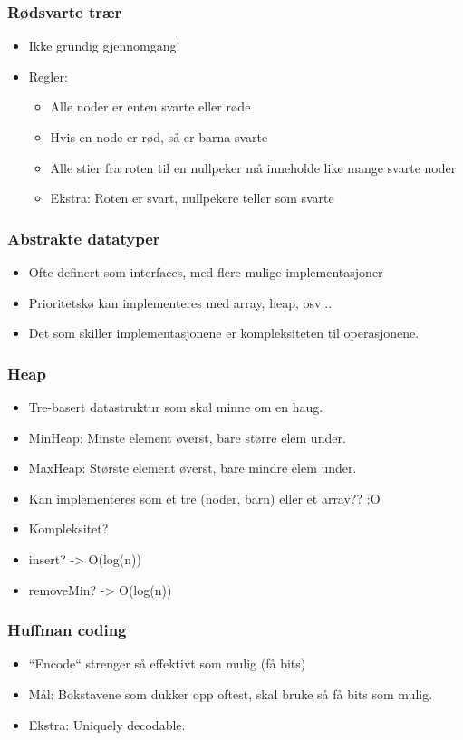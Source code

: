 \documentclass[norsk, handout]{beamer}
\begin{document}
    \begin{frame}
        \frametitle{Rødsvarte trær}
        \begin{itemize}
            \item Ikke grundig gjennomgang!
            \item Regler:
                \begin{itemize}
                    \item Alle noder er enten svarte eller røde
                    \item Hvis en node er rød, så er barna svarte
                    \item Alle stier fra roten til en nullpeker må inneholde like mange
                        svarte noder
                    \item Ekstra: Roten er svart, nullpekere teller som svarte
                \end{itemize}
        \end{itemize}
    \end{frame}

	\begin{frame}
		\frametitle{Abstrakte datatyper}
		\begin{itemize}
			\item Ofte definert som interfaces, med flere mulige implementasjoner
			\item Prioritetskø kan implementeres med array, heap, osv...
			\item Det som skiller implementasjonene er kompleksiteten til operasjonene.
		\end{itemize}
	\end{frame}

	\begin{frame}
		\frametitle{Heap}
		\begin{itemize}
			\item Tre-basert datastruktur som skal minne om en haug.
			\item MinHeap: Minste element øverst, bare større elem under.
			\item MaxHeap: Største element øverst, bare mindre elem under.
			\item Kan implementeres som et tre (noder, barn) eller et array?? :O
			\pause
			\item Kompleksitet?
			\pause
		\item insert? \pause -> O(log(n))
		\item removeMin? \pause -> O(log(n))
		\end{itemize}
	\end{frame}

	\begin{frame}
		\frametitle{Huffman coding}
		\begin{itemize}
			\item ``Encode`` strenger så effektivt som mulig (få bits)
			\item Mål: Bokstavene som dukker opp oftest, skal bruke så få bits som mulig.
			\item Ekstra: Uniquely decodable.
		\end{itemize}
	\end{frame}
\end{document}
